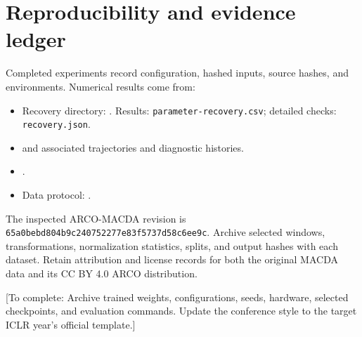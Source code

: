 \documentclass{article}
\newcommand{\pending}[1]{\textcolor{blue!65!black}{[To complete: #1]}}
\begin{document}
\section{Reproducibility and evidence ledger}
Completed experiments record configuration, hashed inputs, source hashes,
and environments. Numerical results come from:
\begin{itemize}
\item Recovery directory: .
Results: \texttt{parameter-recovery.csv}; detailed checks:
\texttt{recovery.json}.
\item {}
and associated trajectories and diagnostic histories.
\item {}.
\item Data protocol: .
\end{itemize}
The inspected ARCO-MACDA revision is
\texttt{65a0bebd804b9c240752277e83f5737d58c6ee9c}.
Archive selected windows, transformations, normalization statistics, splits,
and output hashes with each dataset. Retain attribution and license records
for both the original MACDA data and its CC BY 4.0 ARCO distribution.

\pending{Archive trained weights, configurations, seeds, hardware, selected
checkpoints, and evaluation commands. Update the conference style to the target
ICLR year's official template.}
\end{document}
